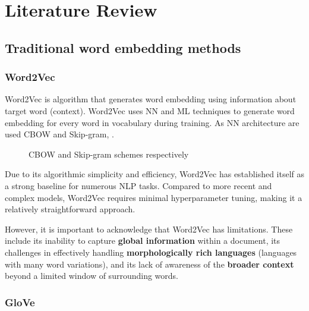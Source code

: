 
\chapter{Literature Review\label{chap:literature_review}}


\section{Traditional word embedding methods}

\subsection{Word2Vec \cite{word2vec}}
Word2Vec is algorithm that generates word embedding using information about target word (context).
Word2Vec uses \ac{NN} and \ac{ML} techniques to generate word embedding for every word in vocabulary during training.
As \ac{NN} architecture are used \ac{CBOW} and Skip-gram, .

\begin{figure}[h]
    \centering
    
    
    \caption{\ac{CBOW} and Skip-gram schemes respectively}
    \label{fig:cbow_skipgram_scheme}
\end{figure} 

Due to its algorithmic simplicity and efficiency, Word2Vec has established itself as a strong baseline for numerous \ac{NLP} tasks.
Compared to more recent and complex models, Word2Vec requires minimal hyperparameter tuning, making it a relatively straightforward approach.

However, it is important to acknowledge that Word2Vec has limitations.
These include its inability to capture \textbf{global information} within a document, its challenges in effectively handling \textbf{morphologically rich languages} (languages with many word variations), and its lack of awareness of the \textbf{broader context} beyond a limited window of surrounding words.

\subsection{GloVe \cite{glove}}
